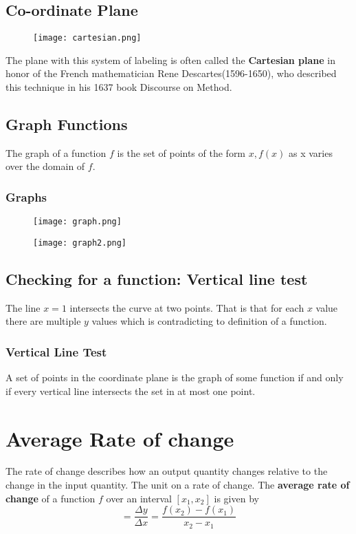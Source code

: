 \subsection{Co-ordinate Plane}
\begin{figure}[h]
    \centering
    \texttt{[image: cartesian.png]}
\end{figure}
The plane with this system of labeling is often called the \textbf{Cartesian plane} in honor of the French mathematician Rene Descartes(1596-1650), who described this technique in his 1637 book Discourse on Method.

\subsection{Graph Functions}
The graph of a function \(f\) is the set of points of the form \(x, f (x)\) as x varies over the domain of \(f\).

\subsubsection{Graphs}
\begin{figure}[h]
  \centering
  \texttt{[image: graph.png]}
\end{figure}
\begin{figure}[h]
  \centering
  \texttt{[image: graph2.png]}
\end{figure}

\subsection{Checking for a function: Vertical line test}
The line \(x=1\) intersects the curve at two points. That is that for each \(x\) value there are multiple \(y\) values which is contradicting to definition of a function.
\subsubsection{Vertical Line Test}
A set of points in the coordinate plane is the graph of some function if and only if every vertical line intersects the set in at most one point.

\section{Average Rate of change}
The rate of change describes how an output quantity changes relative to the change in the input quantity. The unit on a rate of change.
The \textbf{average rate of change} of a function \(f\) over an interval \([x_{1}, x_{2}]\) is given by
\[ =\frac{\Delta y}{\Delta x} =\frac{f(x_{2}) - f(x_{1})}{x_{2} - x_{1}} \]

